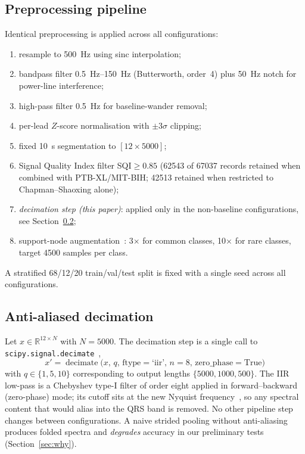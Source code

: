 \documentclass[conference]{IEEEtran}
\begin{document}
\subsection{Preprocessing pipeline}
Identical preprocessing is applied across all configurations:
\begin{enumerate}
  \item resample to \SI{500}{\hertz} using sinc interpolation;
  \item bandpass filter \SIrange{0.5}{150}{\hertz} (Butterworth, order~4)
        plus \SI{50}{\hertz} notch for power-line interference;
  \item high-pass filter \SI{0.5}{\hertz} for baseline-wander removal;
  \item per-lead $Z$-score normalisation with $\pm 3\sigma$ clipping;
  \item fixed \SI{10}{\second} segmentation to $[12 \times \num{5000}]$;
  \item Signal Quality Index filter SQI${} \geq \num{0.85}$
        (\num{62543} of \num{67037} records retained when combined with
        PTB-XL/MIT-BIH; \num{42513} retained when restricted to
        Chapman--Shaoxing alone);
  \item \emph{decimation step (this paper)}: applied only in the
        non-baseline configurations, see Section~\ref{sec:decimation};
  \item support-node augmentation~\cite{xu2022}: 3$\times$ for common
        classes, 10$\times$ for rare classes, target \num{4500}
        samples per class.
\end{enumerate}
A stratified 68/12/20 train/val/test split is fixed with a single seed
across all configurations.

\subsection{Anti-aliased decimation}
\label{sec:decimation}
Let $x\in\mathbb{R}^{12\times N}$ with $N=\num{5000}$. The decimation step
is a single call to \texttt{scipy.signal.decimate}~\cite{scipy2020},
\begin{equation}
x' = \operatorname{decimate}\!\bigl(x,\, q,\,
   \text{ftype}=\text{`iir'},\, n=8,\,
   \text{zero\_phase}=\text{True}\bigr)
\end{equation}
with $q\in\{1,5,10\}$ corresponding to output lengths
$\{\num{5000}, \num{1000}, \num{500}\}$. The IIR low-pass is a Chebyshev
type-I filter of order eight applied in forward--backward (zero-phase)
mode; its cutoff sits at the new Nyquist
frequency~\cite{nyquist1928,oppenheim2009}, so any spectral content that
would alias into the QRS band is removed. No other pipeline step changes
between configurations. A naive strided pooling without anti-aliasing
produces folded spectra and \emph{degrades} accuracy in our preliminary
tests (Section~\ref{sec:why}).
\end{document}
